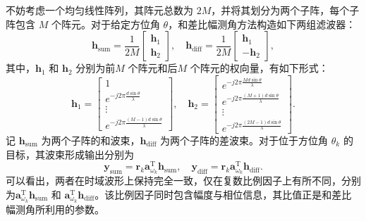 不妨考虑一个均匀线性阵列，其阵元总数为 $2M$，并将其划分为两个子阵，每个子阵包含 $M$ 个阵元。对于给定方位角 $\theta$，和差比幅测角方法构造如下两组滤波器：
\[
    \bm{h}_{\text{sum}} = \frac{1}{2M}
    \begin{bmatrix}
        \bm{h}_1 \\
        \bm{h}_2
    \end{bmatrix}, \quad  \bm{h}_{\text{diff}} = \frac{1}{2M}
    \begin{bmatrix}
        \bm{h}_1 \\
        -\bm{h}_2
    \end{bmatrix},
\]
其中，\( \bm{h}_1 \) 和 \( \bm{h}_2 \) 分别为前\( M \) 个阵元和后\( M \) 个阵元的权向量，有如下形式：
\[
    \bm{h}_1 = \begin{bmatrix}
        1                                           \\
        e^{- j 2 \pi \frac{d \sin \theta}{\lambda}} \\
        \vdots                                      \\
        e^{- j 2 \pi \frac{(M-1) d \sin \theta}{\lambda}}
    \end{bmatrix}, \quad
    \bm{h}_2 = \begin{bmatrix}
        e^{- j 2 \pi \frac{M d \sin \theta}{\lambda}}     \\
        e^{- j 2 \pi \frac{(M+1) d \sin \theta}{\lambda}} \\
        \vdots                                            \\
        e^{- j 2 \pi \frac{(2M-1) d \sin \theta}{\lambda}}
    \end{bmatrix}.
\]
记 $\bm{h}_{\text{sum}}$ 为两个子阵的和波束，$\bm{h}_{\text{diff}}$ 为两个子阵的差波束。对于位于方位角 $\theta_k$ 的目标，其波束形成输出分别为
\[
    \bm{y}_{\text{sum}} =  \bm{r}_k \bm{a}_{\omega_k}^{\mathrm{T}} \bm{h}_{\text{sum}},
    \quad
    \bm{y}_{\text{diff}} = \bm{r}_k \bm{a}_{\omega_k}^{\mathrm{T}} \bm{h}_{\text{diff}}.
\]
可以看出，两者在时域波形上保持完全一致，仅在复数比例因子上有所不同，分别为$\bm{a}_{\omega_k}^{\mathrm{T}} \bm{h}_{\text{sum}}$ 和 $\bm{a}_{\omega_k}^{\mathrm{T}} \bm{h}_{\text{diff}}$。该比例因子同时包含幅度与相位信息，其比值正是和差比幅测角所利用的参数。


